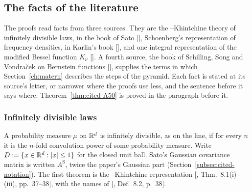 \subsection{The facts of the literature}
\label{sec:cited-literature}

The proofs read facts from three sources. They are the \Levy--Khintchine theory of infinitely
divisible laws, in the book of Sato [], Schoenberg's representation of
\Polya{} frequency densities, in Karlin's book [], and one integral
representation of the modified Bessel function $K_\nu$ []. A fourth source,
the book of Schilling, Song and Vondra\v{c}ek on Bernstein functions
[], supplies the terms in which Section~\ref{ch:matern} describes the
steps of the \Matern{} pyramid. Each fact is stated at its source's letter, or narrower where the
proofs use less, and the sentence before it says where. Theorem~\ref{thm:cited-A50} is proved in
the paragraph before it.

\subsubsection{Infinitely divisible laws}
\label{subsec:cited-sato}

A probability measure $\mu$ on $\mathbb{R}^d$ is infinitely divisible, as on the line, if for every $n$ it
is the $n$-fold convolution power of some probability measure. Write $D := \{x \in \mathbb{R}^d : |x| \le 1\}$
for the closed unit ball. Sato's Gaussian covariance matrix is written $A^{\mathrm S}$, twice the
paper's Gaussian part (Section~\ref{subsec:cited-notation}). The first theorem is the
\Levy--Khintchine representation [, Thm.~8.1(i)--(iii), pp.~37--38], with the
names of [, Def.~8.2, p.~38].

